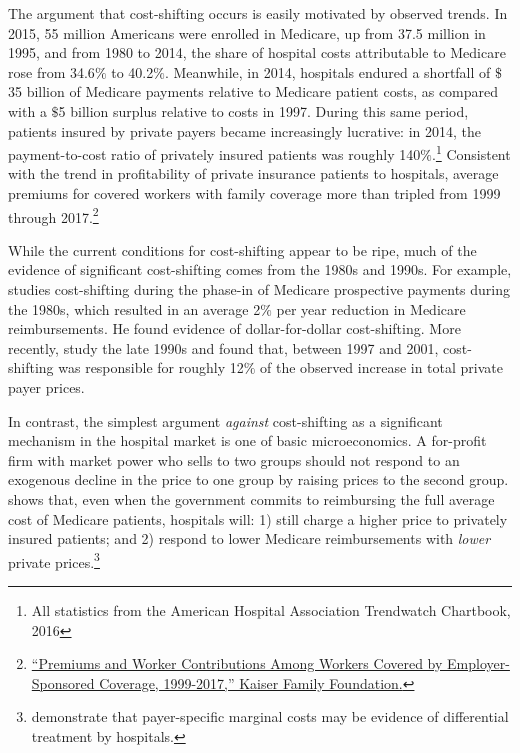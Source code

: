 \documentclass[12pt]{article}
\begin{document}
The argument that cost-shifting occurs is easily motivated by observed trends.  In 2015, 55 million Americans were enrolled in Medicare, up from 37.5 million in 1995, and from 1980 to 2014, the share of hospital costs attributable to Medicare rose from 34.6$\%$ to 40.2$\%$.  Meanwhile, in 2014, hospitals endured a shortfall of $\$$35 billion of Medicare payments relative to Medicare patient costs, as compared with a $\$$5 billion surplus relative to costs in 1997.  During this same period, patients insured by private payers became increasingly lucrative: in 2014, the payment-to-cost ratio of privately insured patients was roughly 140$\%$.\footnote{All statistics from the American Hospital Association Trendwatch Chartbook, 2016} Consistent with the trend in profitability of private insurance patients to hospitals, average premiums for covered workers with family coverage more than tripled from 1999 through 2017.\footnote{\href{https://www.kff.org/interactive/premiums-and-worker-contributions/?coverageGroup=family}{``Premiums and Worker Contributions Among Workers Covered by Employer-Sponsored Coverage, 1999-2017,'' Kaiser Family Foundation.}}

While the current conditions for cost-shifting appear to be ripe, much of the evidence of significant cost-shifting comes from the 1980s and 1990s.  For example, \cite{cutler1998costshift} studies cost-shifting during the phase-in of Medicare prospective payments during the 1980s, which resulted in an average 2$\%$ per year reduction in Medicare reimbursements.  He found evidence of dollar-for-dollar cost-shifting.  More recently, \cite{zwanziger2006} study the late 1990s and found that, between 1997 and 2001, cost-shifting was responsible for roughly 12$\%$ of the observed increase in total private payer prices.

In contrast, the simplest argument \textit{against} cost-shifting as a significant mechanism in the hospital market is one of basic microeconomics.  A for-profit firm with market power who sells to two groups should not respond to an exogenous decline in the price to one group by raising prices to the second group.  \cite{hay1983} shows that, even when the government commits to reimbursing the full average cost of Medicare patients, hospitals will: 1) still charge a higher price to privately insured patients; and 2) respond to lower Medicare reimbursements with \textit{lower} private prices.\footnote{\cite{dor1996} demonstrate that payer-specific marginal costs may be evidence of differential treatment by hospitals.}
\end{document}
